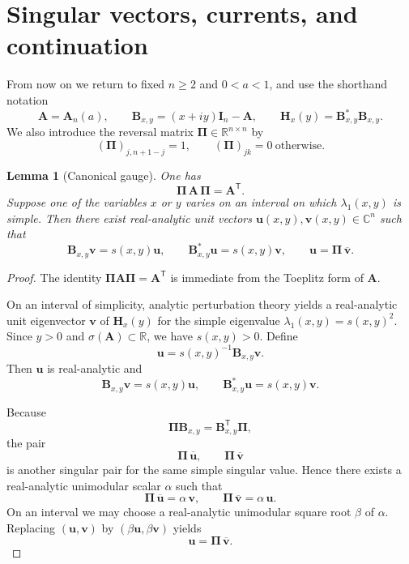 \documentclass[11pt]{article}
\numberwithin{equation}{section}
\newtheorem{lemma}[theorem]{Lemma}
\newcommand{\R}{\mathbb R}
\newcommand{\C}{\mathbb C}
\newcommand{\A}{\mathbf A}
\newcommand{\I}{\mathbf I}
\newcommand{\Bmat}{\mathbf B}
\newcommand{\Hmat}{\mathbf H}
\newcommand{\PiM}{\mathbf \Pi}
\begin{document}
\section{Singular vectors, currents, and continuation}
\label{sec:singular}

From now on we return to fixed \(n\ge2\) and \(0<a<1\), and use the shorthand
notation
\[
\A=\A_n(a),\qquad
\Bmat_{x,y}=(x+iy)\I_n-\A,\qquad
\Hmat_x(y)=\Bmat_{x,y}^*\Bmat_{x,y}.
\]
We also introduce the reversal matrix \(\PiM\in\R^{n\times n}\) by
\[
(\PiM)_{j,n+1-j}=1,\qquad (\PiM)_{jk}=0\ \text{otherwise}.
\]

\begin{lemma}[Canonical gauge]\label{lem:canonical}
One has
\[
\PiM\,\A\,\PiM=\A^{\mathsf T}.
\]
Suppose one of the variables \(x\) or \(y\) varies on an interval on which
\(\lambda_1(x,y)\) is simple. Then there exist real-analytic unit vectors
\(\bm u(x,y),\bm v(x,y)\in\C^n\) such that
\[
\Bmat_{x,y}\bm v=s(x,y)\bm u,
\qquad
\Bmat_{x,y}^*\bm u=s(x,y)\bm v,
\qquad
\bm u=\PiM\,\overline{\bm v}.
\]
\end{lemma}

\begin{proof}
The identity \(\PiM\A\PiM=\A^{\mathsf T}\) is immediate from the Toeplitz form of
\(\A\).

On an interval of simplicity, analytic perturbation theory yields a real-analytic unit
eigenvector \(\bm v\) of \(\Hmat_x(y)\) for the simple eigenvalue
\(\lambda_1(x,y)=s(x,y)^2\).  Since \(y>0\) and \(\sigma(\A)\subset\R\),
we have \(s(x,y)>0\).  Define
\[
\bm u=s(x,y)^{-1}\Bmat_{x,y}\bm v.
\]
Then \(\bm u\) is real-analytic and
\[
\Bmat_{x,y}\bm v=s(x,y)\bm u,
\qquad
\Bmat_{x,y}^*\bm u=s(x,y)\bm v.
\]

Because
\[
\PiM\Bmat_{x,y}=\Bmat_{x,y}^{\mathsf T}\PiM,
\]
the pair
\[
\PiM\,\overline{\bm u},
\qquad
\PiM\,\overline{\bm v}
\]
is another singular pair for the same simple singular value.  Hence there exists a
real-analytic unimodular scalar \(\alpha\) such that
\[
\PiM\,\overline{\bm u}=\alpha\,\bm v,
\qquad
\PiM\,\overline{\bm v}=\alpha\,\bm u.
\]
On an interval we may choose a real-analytic unimodular square root \(\beta\) of
\(\alpha\).  Replacing \((\bm u,\bm v)\) by \((\beta\bm u,\beta\bm v)\) yields
\[
\bm u=\PiM\,\overline{\bm v}.
\]
\end{proof}
\end{document}
